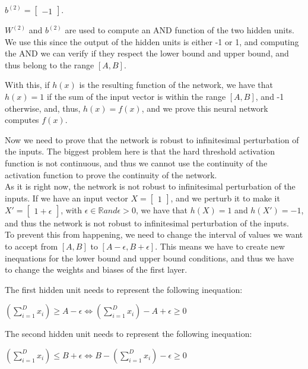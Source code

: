 \documentclass{article}
\begin{document}
\(b^{(2)} = \begin{bmatrix}
    -1
\end{bmatrix}
\).

\(W^{(2)}\) and \(b^{(2)}\) are used to compute an AND function of the two hidden units. We use this since the output of
the hidden units is either -1 or 1, and computing the AND we can verify if they respect the lower bound and upper bound, and thus
belong to the range \([A, B]\). 

With this, if \(h(x)\) is the resulting function of the network, we have that \(h(x) = 1\) if the sum of the input vector is within the range \([A, B]\),
and -1 otherwise, and, thus, \(h(x) = f(x)\), and we prove this neural network computes \(f(x)\).

Now we need to prove that the network is robust to infinitesimal perturbation of the inputs. The biggest problem here is that the hard threshold
activation function is not continuous, and thus we cannot use the continuity of the activation function to prove the continuity of the network. \\

As it is right now, the network is not robust to infinitesimal perturbation of the inputs. If we have an input vector $X = \begin{bmatrix}
    1
\end{bmatrix}
$, and we perturb it to make it $X' = \begin{bmatrix}
    1 + \epsilon
\end{bmatrix}
$, with $\epsilon \in \mathbb{R} and \epsilon > 0$, we have that $h(X) = 1$ and $h(X') = -1$, 
and thus the network is not robust to infinitesimal perturbation of the inputs. \\

To prevent this from happening, we need to change the interval of values we want to accept from $[A, B]$ to $[A - \epsilon, B + \epsilon]$.
This means we have to create new inequations for the lower bound and upper bound conditions, 
and thus we have to change the weights and biases of the first layer.

The first hidden unit needs to represent the following inequation:

$(\sum_{i=1}^{D} x_i) \geq A - \epsilon \iff (\sum_{i=1}^{D} x_i) - A + \epsilon \geq 0$

The second hidden unit needs to represent the following inequation:

$(\sum_{i=1}^{D} x_i) \leq B + \epsilon \iff B - (\sum_{i=1}^{D} x_i) - \epsilon \geq 0$
\end{document}
